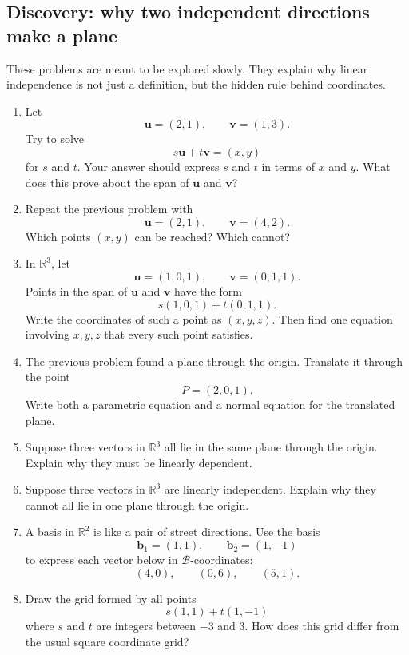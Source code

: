 \subsection{Discovery: why two independent directions make a plane}

These problems are meant to be explored slowly.  They explain why linear independence
is not just a definition, but the hidden rule behind coordinates.

\begin{enumerate}
    \item Let
    \[
        \mathbf u=(2,1),\qquad
        \mathbf v=(1,3).
    \]
    Try to solve
    \[
        s\mathbf u+t\mathbf v=(x,y)
    \]
    for \(s\) and \(t\).  Your answer should express \(s\) and \(t\) in terms of \(x\)
    and \(y\).  What does this prove about the span of \(\mathbf u\) and \(\mathbf v\)?

    \item Repeat the previous problem with
    \[
        \mathbf u=(2,1),\qquad
        \mathbf v=(4,2).
    \]
    Which points \((x,y)\) can be reached?  Which cannot?

    \item In \(\mathbb R^3\), let
    \[
        \mathbf u=(1,0,1),\qquad
        \mathbf v=(0,1,1).
    \]
    Points in the span of \(\mathbf u\) and \(\mathbf v\) have the form
    \[
        s(1,0,1)+t(0,1,1).
    \]
    Write the coordinates of such a point as \((x,y,z)\).  Then find one equation
    involving \(x,y,z\) that every such point satisfies.

    \item The previous problem found a plane through the origin.  Translate it through
    the point
    \[
        P=(2,0,1).
    \]
    Write both a parametric equation and a normal equation for the translated plane.

    \item Suppose three vectors in \(\mathbb R^3\) all lie in the same plane through the
    origin.  Explain why they must be linearly dependent.

    \item Suppose three vectors in \(\mathbb R^3\) are linearly independent.  Explain why
    they cannot all lie in one plane through the origin.

    \item A basis in \(\mathbb R^2\) is like a pair of street directions.  Use the basis
    \[
        \mathbf b_1=(1,1),\qquad
        \mathbf b_2=(1,-1)
    \]
    to express each vector below in \(\mathcal B\)-coordinates:
    \[
        (4,0),\qquad
        (0,6),\qquad
        (5,1).
    \]

    \item Draw the grid formed by all points
    \[
        s(1,1)+t(1,-1)
    \]
    where \(s\) and \(t\) are integers between \(-3\) and \(3\).  How does this grid
    differ from the usual square coordinate grid?
\end{enumerate}

